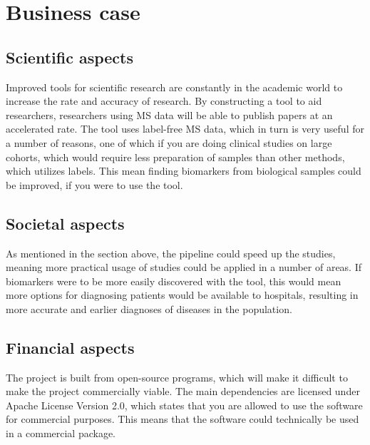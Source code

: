 \section{Business case}

\subsection{Scientific aspects}

Improved tools for scientific research are constantly in the academic world to increase the rate and accuracy of research. By constructing a tool to aid researchers, researchers using MS data will be able to publish papers at an accelerated rate. The tool uses label-free MS data, which in turn is very useful for a number of reasons, one of which if you are doing clinical studies on large cohorts, which would require less preparation of samples than other methods, which utilizes labels. This mean finding biomarkers from biological samples could be improved, if you were to use the tool.

\subsection{Societal aspects}

As mentioned in the section above, the pipeline could speed up the studies, meaning more practical usage of studies could be applied in a number of areas. If biomarkers were to be more easily discovered with the tool, this would mean more options for diagnosing patients would be available to hospitals, resulting in more accurate and earlier diagnoses of diseases in the population.

\subsection{Financial aspects}

The project is built from open-source programs, which will make it difficult to make the project commercially viable. The main dependencies are licensed under Apache License Version 2.0, which states that you are allowed to use the software for commercial purposes. This means that the software could technically be used in a commercial package.
